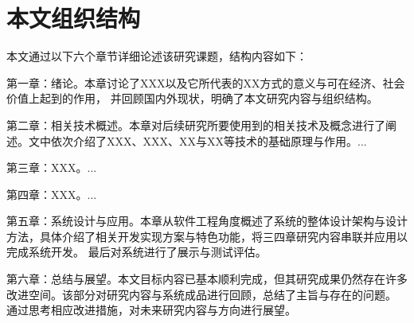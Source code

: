 \section{本文组织结构}

本文通过以下六个章节详细论述该研究课题，结构内容如下：

第一章：绪论。本章讨论了XXX以及它所代表的XX方式的意义与可在经济、社会价值上起到的作用，
并回顾国内外现状，明确了本文研究内容与组织结构。

第二章：相关技术概述。本章对后续研究所要使用到的相关技术及概念进行了阐述。文中依次介绍了XXX、XXX、XX与XX等技术的基础原理与作用。...

第三章：XXX。...

第四章：XXX。...

第五章：系统设计与应用。本章从软件工程角度概述了系统的整体设计架构与设计方法，具体介绍了相关开发实现方案与特色功能，将三四章研究内容串联并应用以完成系统开发。
最后对系统进行了展示与测试评估。

第六章：总结与展望。本文目标内容已基本顺利完成，但其研究成果仍然存在许多改进空间。该部分对研究内容与系统成品进行回顾，总结了主旨与存在的问题。
通过思考相应改进措施，对未来研究内容与方向进行展望。
